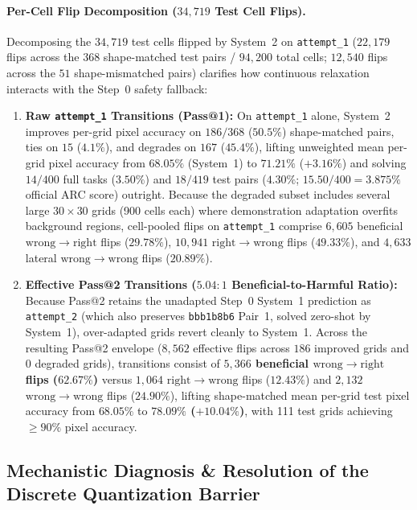 \documentclass[11pt,a4paper]{article}
\theoremstyle{plain}
\theoremstyle{definition}
\theoremstyle{remark}
\begin{document}
\paragraph{Per-Cell Flip Decomposition ($34{,}719$ Test Cell Flips).}
Decomposing the $34{,}719$ test cells flipped by System~2 on \texttt{attempt\_1} ($22{,}179$ flips across the $368$ shape-matched test pairs / $94{,}200$ total cells; $12{,}540$ flips across the $51$ shape-mismatched pairs) clarifies how continuous relaxation interacts with the Step~0 safety fallback:
\begin{enumerate}
    \item \textbf{Raw \texttt{attempt\_1} Transitions (Pass@1):} On \texttt{attempt\_1} alone, System~2 improves per-grid pixel accuracy on $186 / 368$ ($50.5\%$) shape-matched pairs, ties on $15$ ($4.1\%$), and degrades on $167$ ($45.4\%$), lifting unweighted mean per-grid pixel accuracy from $68.05\%$ (System~1) to $71.21\%$ ($+3.16\%$) and solving $14 / 400$ full tasks ($3.50\%$) and $18 / 419$ test pairs ($4.30\%$; $15.50 / 400 = 3.875\%$ official ARC score) outright. Because the degraded subset includes several large $30 \times 30$ grids (900 cells each) where demonstration adaptation overfits background regions, cell-pooled flips on \texttt{attempt\_1} comprise $6{,}605$ beneficial $\mathrm{wrong} \to \mathrm{right}$ flips ($29.78\%$), $10{,}941$ $\mathrm{right} \to \mathrm{wrong}$ flips ($49.33\%$), and $4{,}633$ lateral $\mathrm{wrong} \to \mathrm{wrong}$ flips ($20.89\%$).
    \item \textbf{Effective Pass@2 Transitions ($5.04 : 1$ Beneficial-to-Harmful Ratio):} Because Pass@2 retains the unadapted Step~0 System~1 prediction as \texttt{attempt\_2} (which also preserves \texttt{bbb1b8b6} Pair~1, solved zero-shot by System~1), over-adapted grids revert cleanly to System~1. Across the resulting Pass@2 envelope ($8{,}562$ effective flips across $186$ improved grids and $0$ degraded grids), transitions consist of \textbf{$5{,}366$ beneficial $\mathrm{wrong} \to \mathrm{right}$ flips ($62.67\%$)} versus $1{,}064$ $\mathrm{right} \to \mathrm{wrong}$ flips ($12.43\%$) and $2{,}132$ $\mathrm{wrong} \to \mathrm{wrong}$ flips ($24.90\%$), lifting shape-matched mean per-grid test pixel accuracy from $68.05\%$ to \textbf{$78.09\%$ ($+10.04\%$)}, with 111 test grids achieving $\ge 90\%$ pixel accuracy.
\end{enumerate}

\subsection{Mechanistic Diagnosis \& Resolution of the Discrete Quantization Barrier}
\label{sec:quantization_barrier}
\end{document}
